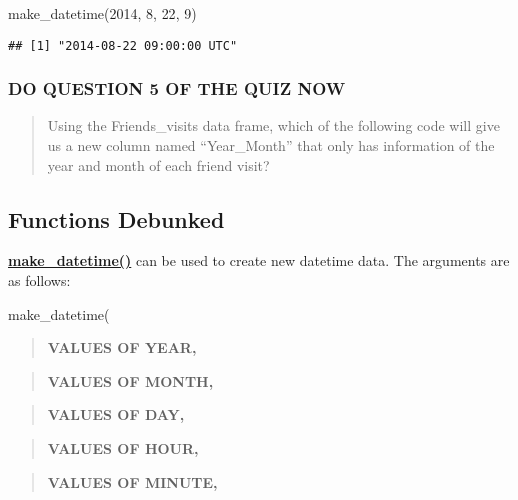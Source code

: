 \documentclass[
]{book}
\newenvironment{Shaded}{\begin{snugshade}}{\end{snugshade}}
\newcommand{\DecValTok}[1]{\textcolor[rgb]{0.00,0.00,0.81}{#1}}
\newcommand{\FunctionTok}[1]{\textcolor[rgb]{0.00,0.00,0.00}{#1}}
\newcommand{\NormalTok}[1]{#1}
\begin{document}
\begin{Shaded}
\begin{Highlighting}[]
\FunctionTok{make\_datetime}\NormalTok{(}\DecValTok{2014}\NormalTok{, }\DecValTok{8}\NormalTok{, }\DecValTok{22}\NormalTok{, }\DecValTok{9}\NormalTok{)}
\end{Highlighting}
\end{Shaded}

\begin{verbatim}
## [1] "2014-08-22 09:00:00 UTC"
\end{verbatim}

\hypertarget{do-question-5-of-the-quiz-now-3}{%
\subsubsection{DO QUESTION 5 OF THE QUIZ NOW}\label{do-question-5-of-the-quiz-now-3}}

\begin{quote}
Using the Friends\_visits data frame, which of the following code will give us a new column named ``Year\_Month'' that only has information of the year and month of each friend visit?
\end{quote}

\hypertarget{functions-debunked-21}{%
\subsection{Functions Debunked}\label{functions-debunked-21}}

\textbf{\href{https://lubridate.tidyverse.org/reference/make_datetime.html}{make\_datetime()}} can be used to create new datetime data. The arguments are as follows:

make\_datetime(

\begin{quote}
\textbf{VALUES OF YEAR,}
\end{quote}

\begin{quote}
\textbf{VALUES OF MONTH,}
\end{quote}

\begin{quote}
\textbf{VALUES OF DAY,}
\end{quote}

\begin{quote}
\textbf{VALUES OF HOUR,}
\end{quote}

\begin{quote}
\textbf{VALUES OF MINUTE,}
\end{quote}
\end{document}
